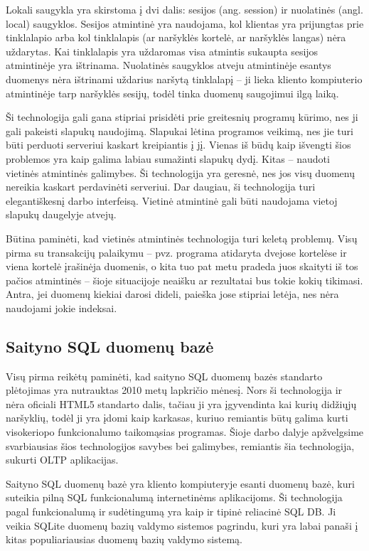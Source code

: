 \documentclass[12pt,a4paper,titlepage]{article}
\begin{document}
Lokali saugykla yra skirstoma į dvi dalis: sesijos (ang. session) ir nuolatinės (angl. local) saugyklos. Sesijos atmintinė yra naudojama, kol klientas yra prijungtas prie tinklalapio arba kol tinklalapis (ar naršyklės kortelė, ar naršyklės langas) nėra uždarytas. Kai tinklalapis yra uždaromas visa atmintis sukaupta sesijos atmintinėje yra ištrinama. Nuolatinės saugyklos atveju atmintinėje esantys duomenys nėra ištrinami uždarius naršytą tinklalapį – ji lieka kliento kompiuterio atmintinėje tarp naršyklės sesijų, todėl tinka duomenų saugojimui ilgą laiką.

Ši technologija gali gana stipriai prisidėti prie greitesnių programų kūrimo, nes ji gali pakeisti slapukų naudojimą. Slapukai lėtina programos veikimą, nes jie turi būti perduoti serveriui kaskart kreipiantis į jį. Vienas iš būdų kaip išvengti šios problemos yra kaip galima labiau sumažinti slapukų dydį. Kitas – naudoti vietinės atmintinės galimybes. Ši technologija yra geresnė, nes jos visų duomenų nereikia kaskart perdavinėti serveriui. Dar daugiau, ši technologija turi elegantiškesnį darbo interfeisą. Vietinė atmintinė gali būti naudojama vietoj slapukų daugelyje atvejų.

Būtina paminėti, kad vietinės atmintinės technologija turi keletą problemų. Visų pirma su transakcijų palaikymu – pvz. programa atidaryta dvejose kortelėse ir viena kortelė įrašinėja duomenis, o kita tuo pat metu pradeda juos skaityti iš tos pačios atmintinės – šioje situacijoje neaišku ar rezultatai bus tokie kokių tikimasi. Antra, jei duomenų kiekiai darosi dideli, paieška jose stipriai letėja, nes nėra naudojami jokie indeksai.

\subsection{Saityno SQL duomenų bazė}

Visų pirma reikėtų paminėti, kad saityno SQL duomenų bazės standarto plėtojimas yra nutrauktas 2010 metų lapkričio mėnesį. Nors ši technologija ir nėra oficiali HTML5 standarto dalis, tačiau ji yra įgyvendinta kai kurių didžiųjų naršyklių, todėl ji yra įdomi kaip karkasas, kuriuo remiantis būtų galima kurti visokeriopo funkcionalumo taikomąsias programas. Šioje darbo dalyje apžvelgsime svarbiausias šios technologijos savybes bei galimybes, remiantis šia technologija, sukurti OLTP aplikacijas.

Saityno SQL duomenų bazė yra kliento kompiuteryje esanti duomenų bazė, kuri suteikia pilną SQL funkcionalumą internetinėms aplikacijoms. Ši technologija pagal funkcionalumą ir sudėtingumą yra kaip ir tipinė reliacinė SQL DB. Ji veikia SQLite duomenų bazių valdymo sistemos pagrindu, kuri yra labai panaši į kitas populiariausias duomenų bazių valdymo sistemą.
\end{document}
